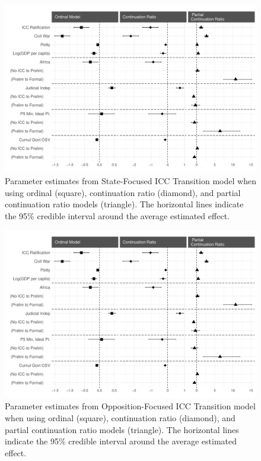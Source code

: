 \begin{figure}
    \centering
    \includegraphics[width=1\textwidth]{modCompare_state.pdf}
    \caption{Parameter estimates from State-Focused ICC Transition model when using ordinal (square), continuation ratio (diamond), and partial continuation ratio models (triangle). The horizontal lines indicate the 95\% credible interval around the average estimated effect.}
    \label{fig:stateCoefCompare}
\end{figure}

\begin{figure}
    \centering
    \includegraphics[width=1\textwidth]{modCompare_opp.pdf}
    \caption{Parameter estimates from Opposition-Focused ICC Transition model when using ordinal (square), continuation ratio (diamond), and partial continuation ratio models (triangle). The horizontal lines indicate the 95\% credible interval around the average estimated effect.}
    \label{fig:oppCoefCompare}
\end{figure}

